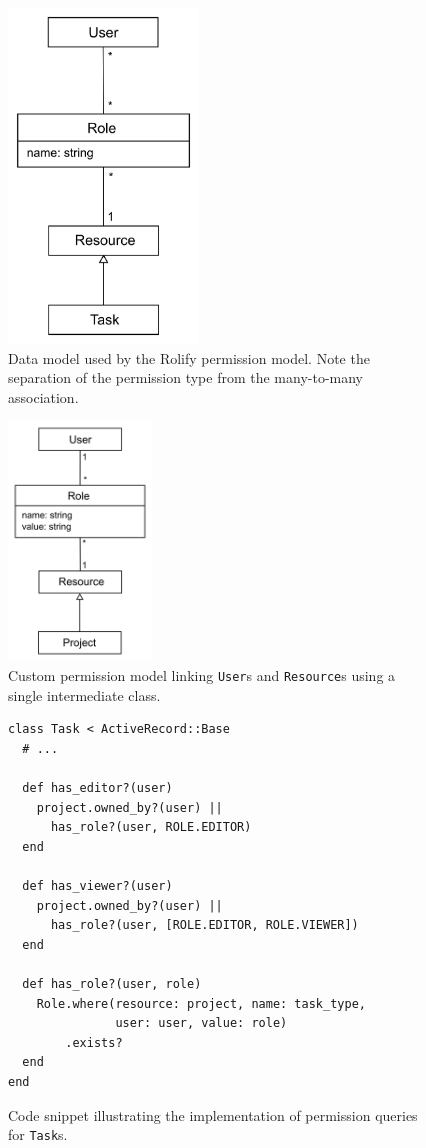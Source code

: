 \documentclass[document.tex]{subfiles}
\begin{document}
\begin{figure}[!ht]
\centering \includegraphics[height=3.5in]{./img/case-study-research-railgun/rolify-data-model}
\caption{Data model used by the Rolify permission model. Note the separation of the permission type from the many-to-many association.}
\label{fig:case-research-rolify-data-model}
\end{figure}

\begin{figure}[!ht]
\centering
\includegraphics[height=2.5in]{./img/case-study-research-railgun/permission-data-model}
\cprotect\caption{Custom permission model linking \verb!User!s and \verb!Resource!s using a single intermediate class.}
\label{fig:case-research-sane-permission-data-model}
\end{figure}

\begin{figure}[!ht]
  \begin{lstlisting}
class Task < ActiveRecord::Base
  # ...

  def has_editor?(user)
    project.owned_by?(user) ||
      has_role?(user, ROLE.EDITOR)
  end

  def has_viewer?(user)
    project.owned_by?(user) ||
      has_role?(user, [ROLE.EDITOR, ROLE.VIEWER])
  end

  def has_role?(user, role)
    Role.where(resource: project, name: task_type,
               user: user, value: role)
        .exists?
  end
end
  \end{lstlisting}
  \cprotect\caption{Code snippet illustrating the implementation of permission queries for \verb!Task!s.}
  \label{fig:case-research-permission-code-example}
\end{figure}
\end{document}
